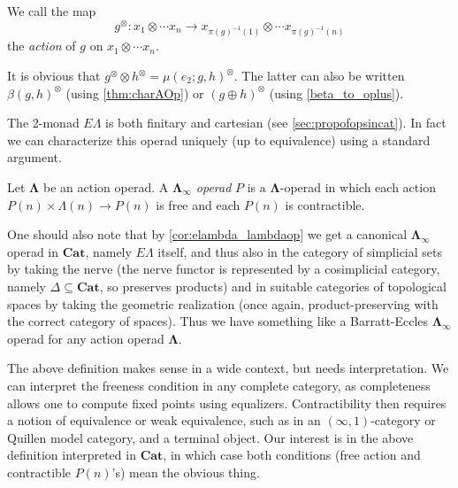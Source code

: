 \documentclass{amsbook} %
\newcommand{\mb}{\mathbf}
\numberwithin{section}{chapter}
\begin{document}
\begin{Defi}\label{action_map}
We call the map 
  \[
    g^{\otimes} \colon x_1 \otimes \cdots x_n \rightarrow x_{\pi(g)^{-1}(1)} \otimes \cdots x_{\pi(g)^{-1}(n)}
  \]
the \emph{action} of $g$ on $x_1 \otimes \cdots x_n$.
\end{Defi}

\begin{rem}
It is obvious that $g^{\otimes} \otimes h^{\otimes} = \mu(e_2; g, h)^{\otimes}$. The latter can also be written $\beta(g, h)^{\otimes}$ (using \cref{thm:charAOp}) or $(g \oplus h)^{\otimes}$  (using \cref{beta_to_oplus}).
\end{rem}

The 2-monad $E\Lambda$ is both finitary and cartesian (see \cref{sec:propofopsincat}).  In fact we can characterize this operad uniquely (up to equivalence) using a standard argument.

\begin{Defi}
Let $\mb{\Lambda}$ be an action operad.  A \textit{$\mb{\Lambda}_{\infty}$ operad} $P$ is a $\mb{\Lambda}$-operad in which each action $P(n) \times \Lambda(n) \rightarrow P(n)$ is free and each $P(n)$ is contractible.
\end{Defi}

\begin{rem}
One should also note that by \cref{cor:elambda_lambdaop} we get a canonical $\mb{\Lambda}_{\infty}$ operad in $\mb{Cat}$, namely $E\Lambda$ itself, and thus also in the category of simplicial sets by taking the nerve (the nerve functor is represented by a cosimplicial category, namely $\Delta \subseteq \mb{Cat}$, so preserves products) and in suitable categories of topological spaces by taking the geometric realization (once again, product-preserving with the correct category of spaces).  Thus we have something like a Barratt-Eccles $\mb{\Lambda}_{\infty}$ operad for any action operad $\mb{\Lambda}$.
\end{rem}

\begin{rem}
The above definition makes sense in a wide context, but needs interpretation.  We can interpret the freeness condition in any complete category, as completeness allows one to compute fixed points using equalizers.  Contractibility then requires a notion of equivalence or weak equivalence, such as in an $(\infty, 1)$-category or Quillen model category, and a terminal object.  Our interest is in the above definition interpreted in $\mb{Cat}$, in which case both conditions (free action and contractible $P(n)$'s) mean the obvious thing.
\end{rem}
\end{document}

